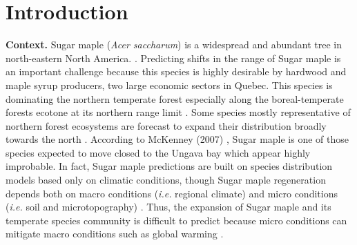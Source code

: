 

\newpage
\setcounter{page}{1}

\section{Introduction}

\textbf{Context.} Sugar maple (\textit{Acer saccharum}) is a widespread and
abundant tree in north-eastern North America.
\cite{Graignic2013,Messaoud2007,Kellman2004,Barras1998}. Predicting shifts in
the range of Sugar maple is an important challenge because this species is
highly desirable by hardwood and maple syrup producers, two large economic
sectors in Quebec. This species is dominating the northern temperate forest
especially along the boreal-temperate forests ecotone at its northern range
limit \cite{Barras1998}. Some species mostly representative of northern
forest ecosystems are forecast to expand their distribution broadly towards
the north \cite{Sciences2014,Iverson2002}. According to McKenney (2007)
\cite{Sciences2014}, Sugar maple is one of those species expected to move
closed to the Ungava bay which appear highly improbable. In fact, Sugar maple
predictions are built on species distribution models based only on climatic
conditions, though Sugar maple regeneration depends both on macro conditions
(\textit{i.e.} regional climate) and micro conditions (\textit{i.e.} soil and
microtopography) \cite{Graignic2013,Lafleur2010}. Thus, the expansion of Sugar
maple and its temperate species community is difficult to predict because
micro conditions can mitigate macro conditions such as global warming
\cite{DeFrenne2013}.\\

